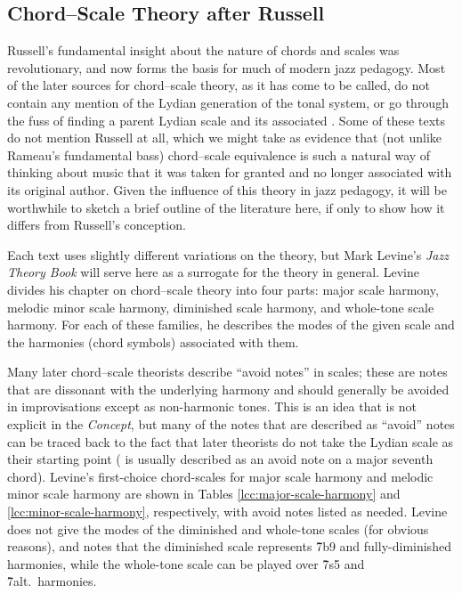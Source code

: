 \subsection{Chord--Scale Theory after Russell}
\label{subsec:chord-scale-reception}

Russell's fundamental insight about the nature of chords and scales was
revolutionary, and now forms the basis for much of modern jazz
pedagogy. Most of the later sources for chord--scale theory, as it has come to
be called, do not contain any mention of the Lydian generation of the tonal
system, or go through the fuss of finding a parent Lydian scale and its
associated . Some of these texts do not mention Russell at all,
which we might take as evidence that (not unlike Rameau's fundamental bass)
chord--scale equivalence is such a natural way of thinking about music that it
was taken for granted and no longer associated with its original author. Given
the influence of this theory in jazz pedagogy, it will be worthwhile to sketch
a brief outline of the literature here, if only to show how it differs from
Russell's conception.

Each text uses slightly different variations on the theory, but Mark
Levine's \emph{Jazz Theory Book} will serve here as a surrogate for the theory
in general. Levine divides his chapter on chord--scale theory into
four parts: major scale harmony, melodic minor scale harmony, diminished scale
harmony, and whole-tone scale harmony. For each of these families, he
describes the modes of the given scale and the harmonies (chord symbols)
associated with them.

Many later chord--scale theorists describe ``avoid notes'' in scales; these
are notes that are dissonant with the underlying harmony and should generally
be avoided in improvisations except as non-harmonic tones. This is an idea
that is not explicit in the \emph{Concept}, but many of the notes that are
described as ``avoid'' notes can be traced back to the fact that later
theorists do not take the Lydian scale as their starting point ( is
usually described as an avoid note on a major seventh chord). Levine's
first-choice chord-scales for major scale harmony and melodic minor scale
harmony are shown in Tables \ref{lcc:major-scale-harmony} and
\ref{lcc:minor-scale-harmony}, respectively, with avoid notes listed as
needed. Levine does not give the modes of the diminished and
whole-tone scales (for obvious reasons), and notes that the diminished scale
represents \h{7b9} and fully-diminished harmonies, while the whole-tone scale
can be played over \h{7s5} and \h{7alt.}\ harmonies.

